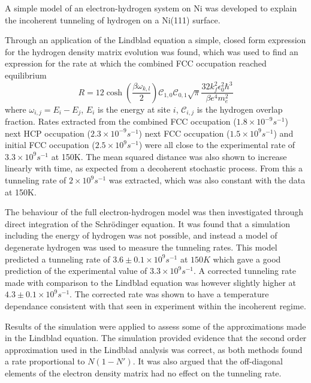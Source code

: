 A simple model of
an electron-hydrogen
system on Ni
was developed
to explain the
incoherent tunneling
of hydrogen on a
Ni(111) surface. %

Through an application
of the Lindblad equation
a simple, closed form
expression for
the hydrogen density matrix
evolution was found,
which was used to
find an expression
for the rate at which
the combined
FCC occupation reached
equilibrium
\begin{equation}
    R   =
    12\cosh{(\frac{\beta \omega_{k,l}}{2})}
    \mathcal{C}_{1,0}\mathcal{C}_{0,1}
    \sqrt{\pi} \frac{32 k_f^2 \epsilon_0^2 \hbar^3}{\beta e^4 m_e^2}
\end{equation}
where \(\omega_{i,j}=E_i - E_j\),
\(E_i\) is the energy at site \(i\),
\(\mathcal{C}_{i,j}\) is the hydrogen
overlap fraction.
Rates extracted from
the combined FCC
occupation (\(1.8\times{}10^{-9}s^{-1}\))
next HCP occupation
(\(2.3\times{}10^{-9}s^{-1}\))
next FCC occupation
(\(1.5\times{}10^9s^{-1}\))
and initial FCC occupation
(\(2.5\times{}10^9s^{-1}\))
were all close to the
experimental rate
of \(3.3 \times{}10^{9}s^{-1}\)
at 150K\cite{Jianding-Zhu}.
The mean squared distance
was also shown to increase
linearly with time, as expected
from a decoherent stochastic
process. From this
a tunneling rate of
\(2 \times{}10^{9}s^{-1}\)
was extracted,
which was also constant with
the data at 150K.

The behaviour of the
full electron-hydrogen
model was then
investigated through
direct integration of
the Schrödinger equation.
It was found that a
simulation
including the energy of
hydrogen was not possible,
and instead a model
of degenerate hydrogen
was used to measure the
tunneling rates.
This model predicted
a tunneling rate of
\(3.6\pm 0.1\times{}10^{9}s^{-1}\)
at \(150K\)
which gave a good
prediction of the
experimental value
of
\(3.3 \times{}10^{9}s^{-1}\)\cite{Jianding-Zhu}.
A corrected tunneling rate
made with comparison
to the Lindblad equation
was
however slightly
higher at
\(4.3\pm 0.1\times{}10^{9}s^{-1}\).
The corrected rate was shown to have
a temperature dependance
consistent with that seen in
experiment
within the incoherent regime.



Results of the simulation
were applied
to assess some of the
approximations
made in the Lindblad equation.
The simulation
provided evidence
that the second order approximation
used in the Lindblad analysis
was correct,
as both methods found a
rate proportional to \(N(1-N')\).
It was also argued that
the off-diagonal
elements of the electron
density matrix
had no effect on the tunneling
rate.

